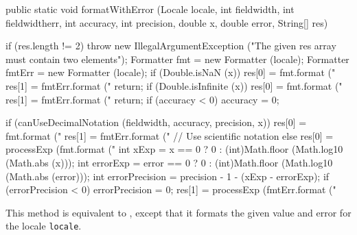\begin{code}

   public static void formatWithError (Locale locale, int fieldwidth,
          int fieldwidtherr, int accuracy, int precision, double x,
          double error, String[] res)\begin{hide} {
      if (res.length != 2)
         throw new IllegalArgumentException ("The given res array must contain two elements");
      Formatter fmt = new Formatter (locale);
      Formatter fmtErr = new Formatter (locale);
      if (Double.isNaN (x)) {
         res[0] = fmt.format ("%
         res[1] = fmtErr.format ("%
         return;
      }
      if (Double.isInfinite (x)) {
         res[0] = fmt.format ("%
         res[1] = fmtErr.format ("%
         return;
      }
      if (accuracy < 0)
         accuracy = 0;

      if (canUseDecimalNotation (fieldwidth, accuracy, precision, x)) {
         res[0] = fmt.format ("%
         res[1] = fmtErr.format ("%
      }
      // Use scientific notation
      else {
         res[0] = processExp (fmt.format ("%
         int xExp = x == 0 ? 0 : (int)Math.floor (Math.log10 (Math.abs (x)));
         int errorExp = error == 0 ? 0 : (int)Math.floor (Math.log10 (Math.abs (error)));
         int errorPrecision = precision - 1 - (xExp - errorExp);
         if (errorPrecision < 0)
            errorPrecision = 0;
         res[1] = processExp (fmtErr.format
         ("%
      }
   }\end{hide}
\end{code}
\begin{tabb}
  This method is equivalent to
  ,
  except that it formats the given value and error for the
  locale \texttt{locale}.
\end{tabb}
\begin{htmlonly}
\end{htmlonly}

